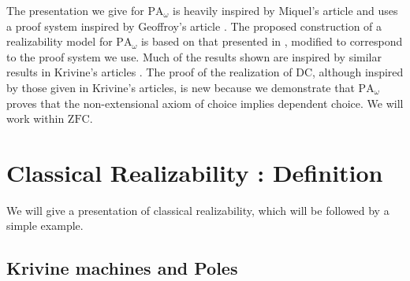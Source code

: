 \documentclass[a4paper,12pt]{article}
\theoremstyle{rmqstyle}
\newcommand{\PA}{\mathrm{PA}}
\newcommand{\DC}{\mathrm{DC}}
\begin{document}
The presentation we give for $\PA_\omega$ is heavily inspired by Miquel's article \cite{MiquelF} and uses a proof system inspired by Geoffroy's article \cite{Geof}. The proposed construction of a realizability model for $\PA_\omega$ is based on that presented in \cite{MiquelF}, modified to correspond to the proof system we use. Much of the results shown are inspired by similar results in Krivine's articles \cite{KrivineRC} \cite{KrivineRA2}. The proof of the realization of $\DC$, although inspired by those given in Krivine's articles, is new because we demonstrate that $\PA_\omega$ proves that the non-extensional axiom of choice implies dependent choice. We will work within $\mathrm{ZFC}$.

\clearpage

\setcounter{secnumdepth}{3}

\section{Classical Realizability : Definition}

We will give a presentation of classical realizability, which will be followed by a simple example.

\subsection{Krivine machines and Poles}
\end{document}
